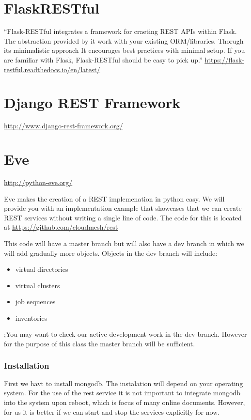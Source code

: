 \section{FlaskRESTful}

``Flask-RESTful integrates a framework for craeting 
REST APIs within Flask. The abstraction provided by it work
with your existing ORM/libraries. Thorugh its minimalistic approach It encourages best
practices with minimal setup. If you are familiar with Flask,
Flask-RESTful should be easy to pick up.''
\url{https://flask-restful.readthedocs.io/en/latest/}

\section{Django REST Framework}

\url{http://www.django-rest-framework.org/}

\section{Eve}

\url{http://python-eve.org/}

Eve makes the creation of a REST implemenation in python easy.  We
will provide you with an implementation example that showcases that we
can create REST services without writing a single line of code. The
code for this is located at \url{https://github.com/cloudmesh/rest}

This code will have a master branch but will also have a dev branch in
which we will add gradually more objects. Objects in the dev branch will
include:

\begin{itemize}
\tightlist
\item
 virtual directories
\item
 virtual clusters
\item
 job sequences
\item
 inventories
\end{itemize}

;You may want to check our active development work in the dev branch.
However for the purpose of this class the master branch will be
sufficient.

\subsubsection{Installation}\label{installation}

First we havt to install mongodb. The instalation will depend on your
operating system. For the use of the rest service it is not important to
integrate mongodb into the system upon reboot, which is focus of many
online documents. However, for us it is better if we can start and stop
the services explicitly for now.

